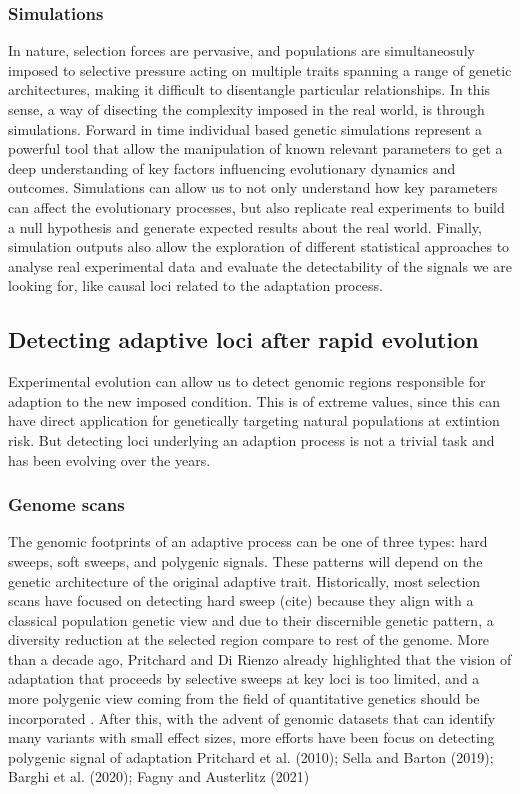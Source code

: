 \documentclass{article}
\begin{document}
\subsubsection{Simulations}
In nature, selection forces are pervasive, and populations are simultaneosuly imposed to selective pressure acting on multiple traits spanning a range of genetic architectures, making it difficult to disentangle particular relationships. In this sense,  a way of disecting the complexity imposed in the real world, is through simulations. Forward in time individual based genetic simulations represent a powerful tool that allow the manipulation of known relevant parameters to get a deep understanding of key factors influencing evolutionary dynamics and outcomes. Simulations can allow us to not only understand how key parameters can affect the evolutionary processes, but also replicate real experiments to build a null hypothesis and generate expected results about the real world.  Finally, simulation outputs also allow the exploration of different statistical approaches to analyse real experimental data and evaluate the detectability of the signals we are looking for, like causal loci related to the adaptation process. 

\subsection{Detecting adaptive loci after rapid evolution}
Experimental evolution can allow us to detect genomic regions responsible for adaption to the new imposed condition. This is of extreme values, since this can have direct application for genetically targeting natural populations at extintion risk. But detecting loci underlying an adaption process is not a trivial task and has been evolving over the years. 

\subsubsection{Genome scans}
The genomic footprints of an adaptive process can be one of three types: hard sweeps, soft sweeps, and polygenic signals. These patterns will depend on the genetic architecture of the original adaptive trait. Historically, most selection scans have focused on detecting hard sweep (cite) because they align with a classical population genetic view and due to their discernible genetic pattern, a diversity reduction at the selected region compare to rest of the genome. More than a decade ago, Pritchard and Di Rienzo already highlighted that the vision of adaptation that proceeds by selective sweeps at key loci is too limited, and a more polygenic view coming from the field of quantitative genetics should be incorporated \citep{Pritchard2010-bv}. After this, with the advent of genomic datasets that can identify many variants with small
effect sizes, more efforts have been focus on detecting polygenic signal of adaptation \citep{Berg2014-zl} Pritchard et al. (2010); Sella and Barton (2019); Barghi et al. (2020); Fagny and Austerlitz (2021) \citep{Stephan2016-tx}
\end{document}
